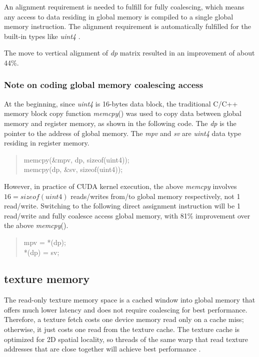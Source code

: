 An alignment requirement is needed to fulfill for fully coalescing, which means any access to data residing in global memory is compiled to a single global memory instruction. The alignment requirement is automatically fulfilled for the built-in types like \emph{uint4} \citep{CUDA-C}.

The move to vertical alignment of \emph{dp} matrix resulted in an improvement of about 44\%.

\subsubsection*{Note on coding global memory coalescing access}
At the beginning, since \emph{uint4} is 16-bytes data block, the traditional C/C++ memory block copy function \emph{memcpy}() was used to copy data between global memory and register memory, as shown in the following code. The \emph{dp} is the pointer to the address of global memory. The \emph{mpv} and \emph{sv} are \emph{uint4} data type residing in register memory.

\begin{quote}
\selectfont
 memcpy(\&mpv, dp, sizeof(uint4));\\
 memcpy(dp, \&sv, sizeof(uint4));
\end{quote}

However, in practice of CUDA kernel execution, the above \emph{memcpy} involves $16 = sizeof(uint4)$ reads/writes from/to global memory respectively, not 1 read/write. Switching to the following direct assignment instruction will be 1 read/write and fully coalesce access global memory, with 81\% improvement over the above \emph{memcpy}().

\begin{quote}
\selectfont
 mpv = *(dp);\\
 *(dp) = sv;
\end{quote}

\subsection{texture memory}
\label{tex}

The read-only texture memory space is a cached window into global memory that offers much lower latency and does not require coalescing for best performance. Therefore, a texture fetch costs one device memory read only on a cache miss; otherwise, it just costs one read from the texture cache. The texture cache is optimized for 2D spatial locality, so threads of the same warp that read texture addresses that are close together will achieve best performance \citep{CUDA-C}.

